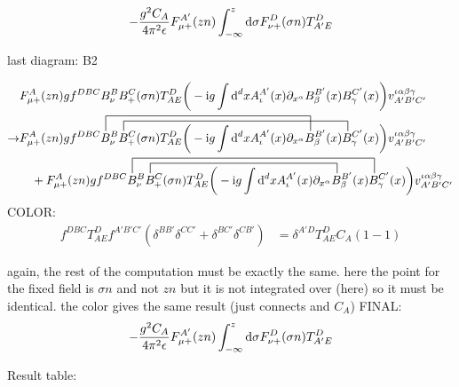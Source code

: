 \begin{align}
	-\frac{ g^2 C_A}{4\pi^2 \epsilon} 
	F_{\mu +}^{A'}(zn)\int_{-\infty}^z \text{d} \sigma F_{\nu +}^D (\sigma n) T^D_{A'E}
\end{align}

last diagram: B2

\begin{align}
	&\ft_{\mu+}^A(zn) gf^{DBC}B_\nu^BB_+^C(\sigma n) T^D_{AE}\bigg(-\imag g \int \ddx xA_\iota^{A'}(x) \partial_{x^\alpha} B_\beta^{B'} (x) B_\gamma^{C'}(x) \bigg) v^{\iota \alpha\beta\gamma}_{A'B'C'}
	\\
	\rightarrow &
	\contraction[3ex]{\ft_{\mu+}^A(zn) gf^{DBC}}{B}{_\nu^BB_+^C(\sigma n) T^D_{AE}\bigg(-\imag g \int \ddx xA_\iota^{A'}(x) \partial_{x^\alpha} }{B}
	\contraction[2ex]{\ft_{\mu+}^A(zn) gf^{DBC}B_\nu^B}{B}{_+^C(\sigma n) T^D_{AE}\bigg(-\imag g \int \ddx xA_\iota^{A'}(x) \partial_{x^\alpha} B_\beta^{B'} (x) }{B}
	\ft_{\mu+}^A(zn) gf^{DBC}B_\nu^BB_+^C(\sigma n) T^D_{AE}\bigg(-\imag g \int \ddx xA_\iota^{A'}(x) \partial_{x^\alpha} B_\beta^{B'} (x) B_\gamma^{C'}(x) \bigg) v^{\iota \alpha\beta\gamma}_{A'B'C'}
	\nl
	\contraction[3ex]{+\ft_{\mu+}^A(zn) gf^{DBC}}{B}{_\nu^BB_+^C(\sigma n) T^D_{AE}\bigg(-\imag g \int \ddx xA_\iota^{A'}(x) \partial_{x^\alpha} B_\beta^{B'} (x) }{B}
	\contraction[2ex]{+\ft_{\mu+}^A(zn) gf^{DBC}B_\nu^B}{B}{_+^C(\sigma n) T^D_{AE}\bigg(-\imag g \int \ddx xA_\iota^{A'}(x) \partial_{x^\alpha}}{B}
	+\ft_{\mu+}^A(zn) gf^{DBC}B_\nu^BB_+^C(\sigma n) T^D_{AE}\bigg(-\imag g \int \ddx xA_\iota^{A'}(x) \partial_{x^\alpha} B_\beta^{B'} (x) B_\gamma^{C'}(x) \bigg) v^{\iota \alpha\beta\gamma}_{A'B'C'}
\end{align}
COLOR:
\begin{align}
	f^{DBC}T^D_{AE}f^{A'B'C'} (\delta^{BB'}\delta^{CC'}+\delta^{BC'}\delta^{CB'})
	&=
	\delta^{A'D}T^D_{AE}C_A(1-1)
\end{align}

again, the rest of the computation must be exactly the same. here the point for the fixed field is $\sigma n$ and not $zn$ but it is not integrated over (here) so it must be identical. the color gives the same result (just connects and $C_A$)
FINAL:
\begin{align}
-\frac{ g^2 C_A}{4\pi^2 \epsilon} 
F_{\mu +}^{A'}(zn)\int_{-\infty}^z \text{d} \sigma F_{\nu +}^D (\sigma n) T^D_{A'E}
\end{align}

Result table:

